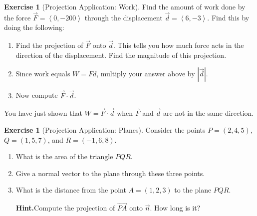 \documentclass[10pt,]{book}
\theoremstyle{plain}
\theoremstyle{definition}
\theoremstyle{definition}
\theoremstyle{definition}
\theoremstyle{definition}
\newtheorem{exploration}[project]{Exercise}
\theoremstyle{definition}
\numberwithin{equation}{section}
\newcommand{\lt}{<}
\begin{document}
\begin{exploration}[Projection Application: Work]\label{first_work_problem}
Find the amount of work done by the force \(\vec F=\left\lt 0,-200\right>\) through the displacement \(\vec d=\left\lt 6,-3\right>\). Find this by doing the following:%
\begin{enumerate}[font=\bfseries,label=(\alph*),ref=\alph*]
\item\label{task-87} Find the projection of \(\vec F\) onto \(\vec d\). This tells you how much force acts in the direction of the displacement. Find the magnitude of this projection.%
\item\label{task-88} Since work equals \(W=Fd\), multiply your answer above by \(|\vec {d}|\).%
\item\label{task-89} Now compute \(\vec F\cdot \vec d\).%
\end{enumerate}
\bigbreak
You have just shown that \(W=\vec F\cdot \vec d\) when \(\vec F\) and \(\vec d\) are not in the same direction.%
\end{exploration}
\begin{exploration}[Projection Application: Planes]\label{exploration-53}
Consider the points \(P=(2,4,5)\), \(Q=(1,5,7)\), and \(R=(-1,6,8)\).%
\begin{enumerate}[font=\bfseries,label=(\alph*),ref=\alph*]
\item\label{task-90} What is the area of the triangle \(PQR\).%
\item\label{task-91} Give a normal vector to the plane through these three points.%
\item\label{task-92} What is the distance from the point \(A=(1,2,3)\) to the plane \(PQR\).%
\par\medskip\noindent%
\textbf{Hint.}\quad Compute the projection of \(\vec {PA}\) onto \(\vec n\). How long is it?%
\end{enumerate}
\end{exploration}
\typeout{************************************************}
\typeout{************************************************}
\end{document}
